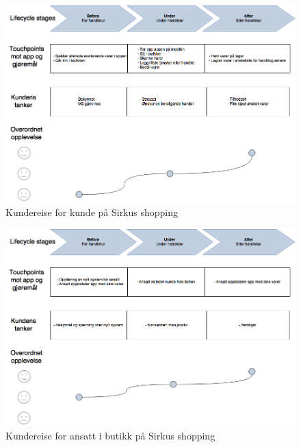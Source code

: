 \begin{figure}[H]
\includegraphics[scale=0.49]{images/customerjourneyBlueprint/cjKunde}
\centering %
\caption{Kundereise for kunde på Sirkus shopping}
\label{fig:customerKunde}
\end{figure}

\begin{figure}[H]
\includegraphics[scale=0.49]{images/customerjourneyBlueprint/cjAnsatt}
\centering %
\caption{Kundereise for ansatt i butikk på Sirkus shopping}
\label{fig:customerAnsatt}
\end{figure}

